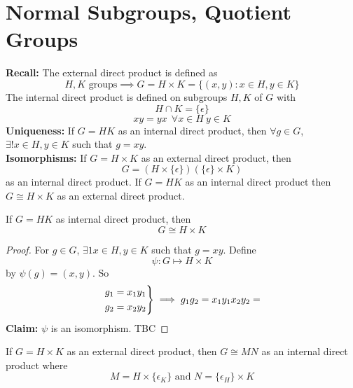 \documentclass[openany]{report}
\begin{document}
\chapter{Normal Subgroups, Quotient Groups}
\textbf{Recall:} The external direct product is defined as 
\[H,K \text{ groups} \implies G = H \times K = \{(x,y) : x\in H, y \in K\}\]
The internal direct product is defined on subgroups $H, K$ of $G$ with 
\[H \cap K = \{\epsilon\}\]
\[xy = yx \ \ \forall x \in H \ y \in K\]
\textbf{Uniqueness:} If $G = HK$ as an internal direct product, then $\forall g \in G$, $\exists ! x \in H, y \in K$ such that $g = xy$.\\[2ex]
\textbf{Isomorphisms:} If $G = H \times K$ as  an external direct product, then
\[G = (H \times \{\epsilon\})(\{\epsilon\} \times K)\]
as an internal direct product. If $G = HK$ as an internal direct product then $G \cong H \times K$ as an external direct product.
\begin{theorem}
    If $G = HK$ as internal direct product, then 
    \[G \cong H \times K\]
\end{theorem}
\begin{proof}
    For $g \in G$, $\exists 1 x \in H, y \in K$ such that $g = xy$. Define
    \[\psi: G \mapsto H \times K\]
    by $\psi(g) = (x,y)$. So 
    \[\begin{rcases}
        g_1 = x_1y_1\\
        g_2 = x_2y_2
    \end{rcases}\implies g_1g_2 = x_1y_1x_2y_2 = \]
    \textbf{Claim:} $\psi$ is an isomorphism.
    TBC
\end{proof}
\begin{theorem}
    If $G = H \times K$ as an external direct product, then $G \cong MN$ as an internal direct product where 
    \[M = H \times \{\epsilon_K\} \text{ and } N = \{\epsilon_H\} \times K\]
\end{theorem}
    
\end{document}
